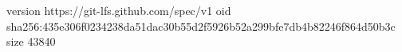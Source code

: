 version https://git-lfs.github.com/spec/v1
oid sha256:435e306f0234238da51dac30b55d2f5926b52a299bfe7db4b82246f864d50b3c
size 43840
